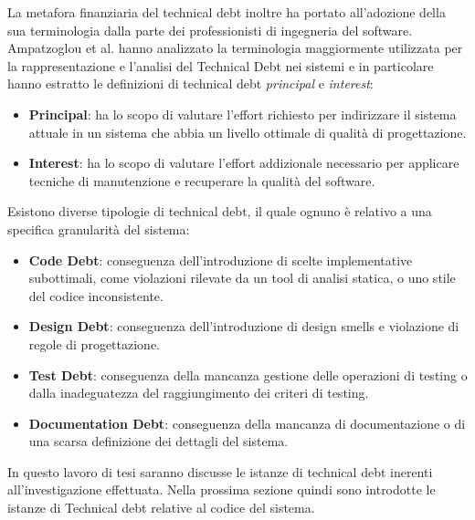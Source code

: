 La metafora finanziaria del technical debt inoltre ha portato all'adozione della sua terminologia dalla parte dei professionisti di ingegneria del software.
Ampatzoglou et al. \cite{AMPATZOGLOU201552} hanno analizzato la terminologia maggiormente utilizzata per la rappresentazione e l'analisi del Technical Debt nei sistemi e in particolare hanno estratto le definizioni di technical debt \textit{principal} e \textit{interest}:
\begin{itemize}
    \item \textbf{Principal}: ha lo scopo di valutare l'effort richiesto per indirizzare il sistema attuale in un sistema che abbia un livello ottimale di qualità di progettazione. 
    \item \textbf{Interest}: ha lo scopo di valutare l'effort addizionale necessario per applicare tecniche di manutenzione e recuperare la qualità del software.
\end{itemize}




Esistono diverse tipologie di technical debt, il quale ognuno è relativo a una specifica granularità del sistema:
\begin{itemize}
    \item \textbf{Code Debt}: conseguenza dell'introduzione di scelte implementative subottimali, come violazioni rilevate da un tool di analisi statica, o uno stile del codice inconsistente.
    \item \textbf{Design Debt}: conseguenza dell'introduzione di design smells e violazione di regole di progettazione.
    \item \textbf{Test Debt}: conseguenza della mancanza gestione delle operazioni di testing o dalla inadeguatezza del raggiungimento dei criteri di testing.
    \item \textbf{Documentation Debt}: conseguenza della mancanza di documentazione o di una scarsa definizione dei dettagli del sistema.
\end{itemize}

In questo lavoro di tesi saranno discusse le istanze di technical debt inerenti all'investigazione effettuata.
Nella prossima sezione quindi sono introdotte le istanze di Technical debt relative al codice del sistema.
